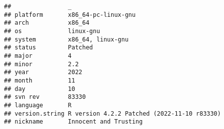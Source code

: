 \documentclass[]{book}
\begin{document}
\begin{verbatim}
##                _                                          
## platform       x86_64-pc-linux-gnu                        
## arch           x86_64                                     
## os             linux-gnu                                  
## system         x86_64, linux-gnu                          
## status         Patched                                    
## major          4                                          
## minor          2.2                                        
## year           2022                                       
## month          11                                         
## day            10                                         
## svn rev        83330                                      
## language       R                                          
## version.string R version 4.2.2 Patched (2022-11-10 r83330)
## nickname       Innocent and Trusting
\end{verbatim}


\end{document}
